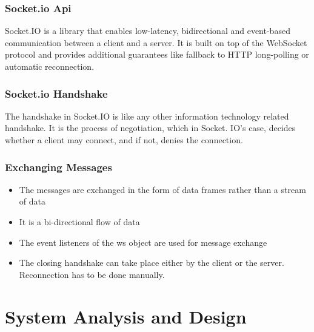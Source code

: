 \subsection{Socket.io Api}
Socket.IO is a library that enables low-latency, bidirectional and event-based communication between a client and a server. It is built on top of the WebSocket protocol and provides additional guarantees like fallback to HTTP long-polling or automatic reconnection.

\subsection{Socket.io Handshake}
The handshake in Socket.IO is like any other information technology related handshake. It is the process of negotiation, which in Socket. IO's case, decides whether a client may connect, and if not, denies the connection.

\subsection{Exchanging Messages}
\vspace{-18pt}
\begin{itemize}
	\item The messages are exchanged in the form of data frames rather than a stream of data
	\item It is a bi-directional flow of data
	\item The event listeners of the ws object are used for message exchange
	\item The closing handshake can take place either by the client or the server. Reconnection has to be done manually.
\end{itemize}


\chapter{System Analysis and Design}
